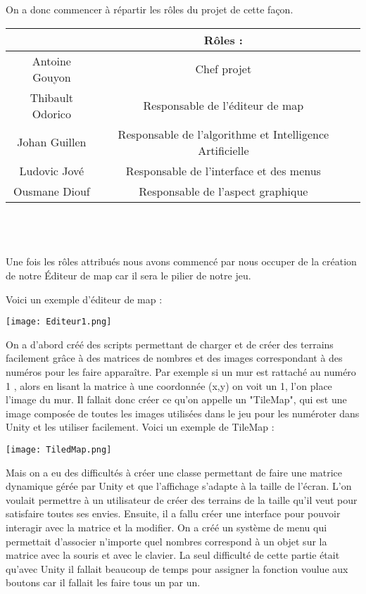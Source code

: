 \documentclass[12pt,a4paper,article]{article} %
\begin{document}
On a donc commencer à répartir les rôles du projet de cette façon.\\
\noindent
\begin{tabular}{|c|c|c}
  \hline
  & Rôles : \\
  \hline
  Antoine Gouyon & Chef projet\\
  \hline
  Thibault Odorico & Responsable de l'éditeur de map\\
  \hline
  Johan Guillen & Responsable de l'algorithme et Intelligence Artificielle\\
  \hline
  Ludovic Jové & Responsable de l'interface et des menus\\
  \hline
  Ousmane Diouf & Responsable de l'aspect graphique\\
  \hline
\end{tabular}\\
\\
\\Une fois les rôles attribués nous avons commencé par  nous occuper de la création de notre Éditeur de map car il sera le pilier de notre jeu. 


Voici un exemple d'éditeur de map : 
\begin{center}
\texttt{[image: Editeur1.png]}
\end{center}


On a d'abord créé des scripts permettant de charger et de créer des terrains facilement grâce à  des matrices de nombres et des images correspondant à des numéros pour les faire apparaître. Par exemple si un mur est rattaché au numéro 1 , alors en lisant la matrice à une coordonnée (x,y) on voit un 1, l'on place l'image du mur. Il fallait donc créer ce qu'on appelle un "TileMap", qui est une image composée de toutes les images utilisées dans le jeu pour les numéroter dans Unity et les utiliser facilement.
Voici un exemple de TileMap : \\
\begin{center}
\texttt{[image: TiledMap.png]}
\end{center}

Mais on a eu des difficultés à créer une classe permettant de faire une matrice dynamique gérée par Unity et que l'affichage s'adapte à la taille de l'écran. L'on voulait permettre à un utilisateur de créer des terrains de la taille qu'il veut pour satisfaire toutes ses envies.
Ensuite, il a fallu créer une interface pour pouvoir interagir avec la matrice et la modifier. On a créé un système de menu qui permettait d'associer n'importe quel nombres correspond à un objet sur la matrice avec la souris et avec le clavier. La seul difficulté de cette partie était qu'avec Unity il fallait beaucoup de temps pour assigner la fonction voulue aux boutons car il fallait les faire tous un par un.\\
\end{document}
